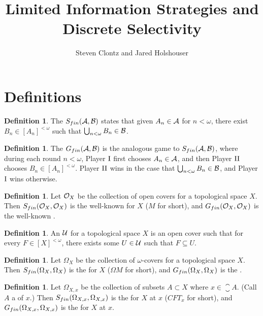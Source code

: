 \documentclass[11pt]{article}
\title{Limited Information Strategies and Discrete Selectivity}
\author{Steven Clontz and Jared Holshouser}
\theoremstyle{plain}
\theoremstyle{definition}
\newtheorem{definition}[theorem]{Definition}
\theoremstyle{remark}
\theoremstyle{plain}
\theoremstyle{definition}
\theoremstyle{remark}
\begin{document}
\maketitle

\section{Definitions}

\begin{definition}
  The  \(S_{fin}(\mathcal{A},\mathcal{B})\) states that
  given \(A_n\in\mathcal{A}\) for \(n<\omega\), there exist \(B_n\in[A_n]^{<\omega}\)
  such that \(\bigcup_{n<\omega}B_n\in\mathcal{B}\).
\end{definition}

\begin{definition}
  The  \(G_{fin}(\mathcal{A},\mathcal{B})\) is the
  analogous game to \(S_{fin}(\mathcal{A},\mathcal{B})\), where during each
  round \(n<\omega\), Player \(\mathrm{I}\) first
  chooses \(A_n\in\mathcal{A}\), and then Player \(\mathrm{II}\) chooses
  \(B_n\in[A_n]^{<\omega}\).
  Player \(\mathrm{II}\) wins in the case that \(\bigcup_{n<\omega}B_n\in\mathcal{B}\),
  and Player \(\mathrm{I}\) wins otherwise.
\end{definition}

\begin{definition}
  Let \(\mathcal{O}_X\) be the collection of open covers for a topological space
  \(X\). Then \(S_{fin}(\mathcal{O}_X,\mathcal{O}_X)\) is the well-known
   for \(X\) (\(M\) for short), and
  \(G_{fin}(\mathcal{O}_X,\mathcal{O}_X)\) is the
  well-known .
\end{definition}

\begin{definition}
  An  \(\mathcal{U}\)
  for a topological space \(X\) is an open cover
  such that for every \(F\in[X]^{<\omega}\), there exists some \(U\in\mathcal{U}\)
  such that \(F\subseteq U\).
\end{definition}

\begin{definition}
  Let \(\Omega_X\) be the collection of \(\omega\)-covers for a topological
  space \(X\). Then \(S_{fin}(\Omega_X,\Omega_X)\) is the
   for \(X\) (\(\Omega M\) for short), and
  \(G_{fin}(\Omega_X,\Omega_X)\) is the .
\end{definition}

\begin{definition}
  Let \(\Omega_{X,x}\) be the collection of subsets \(A\subset X\) where
  \(x\in\closure{A}\). (Call \(A\) a  of \(x\).)
  Then \(S_{fin}(\Omega_{X,x},\Omega_{X,x})\) is the
   for \(X\) at \(x\)
  (\(CFT_x\) for short), and
  \(G_{fin}(\Omega_{X,x},\Omega_{X,x})\) is the
   for \(X\) at \(x\).
\end{definition}
\end{document}
